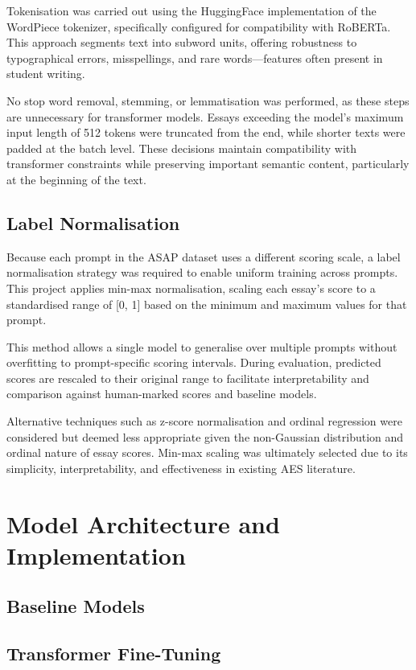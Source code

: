 \documentclass[12pt,a4paper]{report}
\begin{document}
Tokenisation was carried out using the HuggingFace implementation of the WordPiece tokenizer, specifically configured for compatibility with RoBERTa. This approach segments text into subword units, offering robustness to typographical errors, misspellings, and rare words—features often present in student writing.

No stop word removal, stemming, or lemmatisation was performed, as these steps are unnecessary for transformer models. Essays exceeding the model's maximum input length of 512 tokens were truncated from the end, while shorter texts were padded at the batch level. These decisions maintain compatibility with transformer constraints while preserving important semantic content, particularly at the beginning of the text.

\subsection{Label Normalisation}
Because each prompt in the ASAP dataset uses a different scoring scale, a label normalisation strategy was required to enable uniform training across prompts. This project applies min-max normalisation, scaling each essay’s score to a standardised range of [0, 1] based on the minimum and maximum values for that prompt.

This method allows a single model to generalise over multiple prompts without overfitting to prompt-specific scoring intervals. During evaluation, predicted scores are rescaled to their original range to facilitate interpretability and comparison against human-marked scores and baseline models.

Alternative techniques such as z-score normalisation and ordinal regression were considered but deemed less appropriate given the non-Gaussian distribution and ordinal nature of essay scores. Min-max scaling was ultimately selected due to its simplicity, interpretability, and effectiveness in existing AES literature.


\section{Model Architecture and Implementation}
\subsection{Baseline Models}
\subsection{Transformer Fine-Tuning}
\end{document}
